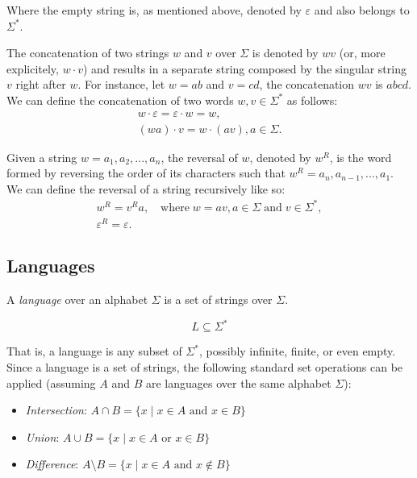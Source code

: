 Where the empty string is, as mentioned above, denoted by $\varepsilon$ and also belongs to $\Sigma^*$.

The concatenation of two strings $w$ and $v$ over $\Sigma$ is denoted by $wv$ (or, more explicitely, $w \cdot v$) and results in a separate string composed by the singular string $v$ right after $w$. For instance, let $w = ab$ and $v = cd$, the concatenation $wv$ is $abcd$. We can define the concatenation of two words $w, v \in \Sigma^*$ as follows:
\begin{gather*}
	w \cdot \varepsilon = \varepsilon \cdot w = w, \\
	(wa) \cdot v = w \cdot (av), a \in \Sigma.
\end{gather*}

Given a string $w = a_1, a_2, ..., a_n$, the reversal of $w$, denoted by $w^R$, is the word formed by reversing the order of its characters such that $w^R = a_n, a_{n-1}, ..., a_1$. We can define the reversal of a string recursively like so:
\begin{gather*}
	w^R = v^Ra, \quad \text{where} \; w=av, a \in \Sigma \; \text{and} \; v \in \Sigma^*, \\
	\varepsilon^R = \varepsilon.
\end{gather*}

\subsection*{Languages}

A \emph{language} over an alphabet $\Sigma$ is a set of strings over $\Sigma$.

\[
L \subseteq \Sigma^*
\]

That is, a language is any subset of $\Sigma^*$, possibly infinite, finite, or even empty. \newline
Since a language is a set of strings, the following standard set operations can be applied (assuming $A$ and $B$ are languages over the same alphabet $\Sigma$):

\begin{itemize}
	\item \emph{Intersection}: $A \cap B = \{ x \mid x \in A \text{ and } x \in B \}$
	\item \emph{Union}: $A \cup B = \{ x \mid x \in A \text{ or } x \in B \}$
	\item \emph{Difference}: $A \setminus B = \{ x \mid x \in A \text{ and } x \notin B \}$
\end{itemize}

